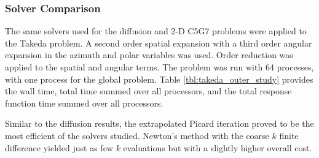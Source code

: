 \subsubsection{Solver Comparison}

The same solvers used for the diffusion  
and 2-D C5G7 problems were applied to the Takeda problem. A second 
order spatial expansion with a third order angular expansion in the 
azimuth and polar variables was used.  Order reduction was applied to 
the spatial and angular terms.  The problem was run with 64 processes, with 
one process for the global problem.  Table \ref{tbl:takeda_outer_study} 
provides the wall time, total time summed over all processors, and the 
total response function time summed over all processors.  

Similar to the diffusion results, the extrapolated Picard iteration 
proved to be the most efficient of the solvers studied.  
Newton's method with the coarse $k$ finite difference yielded just as 
few $k$ evaluations but with a slightly higher overall cost.

